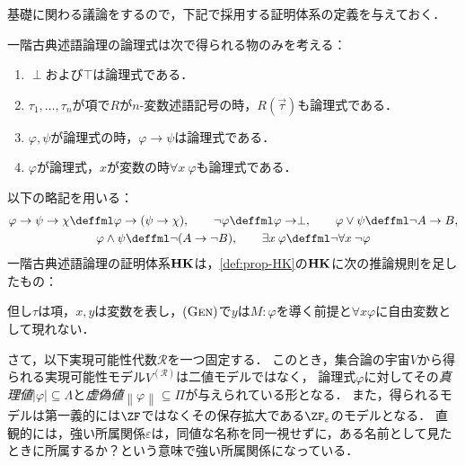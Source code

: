 \documentclass[realisability.tex]{subfiles}
\begin{document}
基礎に関わる議論をするので，下記で採用する証明体系の定義を与えておく．
\begin{definition}
 一階古典述語論理の論理式は次で得られる物のみを考える：
 \begin{enumerate}[series=fml-def]
  \item $\perp$および$\top$は論理式である．
  \item $\tau_1, \dots, \tau_n$が項で$R$が$n$-変数述語記号の時，$R(\vec{\tau})$も論理式である．
  \item $\varphi, \psi$が論理式の時，$\varphi \to \psi$は論理式である．
  \item $\varphi$が論理式，$x$が変数の時$\forall x\: \varphi$も論理式である．
 \end{enumerate}
 以下の略記を用いる：
 \begin{gather*}
  \varphi \to \psi \to \chi \deffml \varphi \to (\psi \to \chi),\qquad
  \neg \varphi \deffml \varphi \to \perp,\qquad
  \varphi \lor \psi \deffml \neg A \to B,\\
  \varphi \land \psi \deffml \neg (A \to \neg B),\qquad
  \exists x \: \varphi \deffml \neg \forall x\: \neg \varphi
 \end{gather*}
 一階古典述語論理の証明体系$\mathord{\mathbf{HK}}$は，\cref{def:prop-HK}の$\mathord{\mathbf{HK}}$に次の推論規則を足したもの：
 \begin{center}
 \end{center} 
 但し$\tau$は項，$x, y$は変数を表し，$(\mathord{\textsc{Gen}})$で$y$は$M: \varphi$を導く前提と$\forall x \varphi$に自由変数として現れない．
\end{definition}
さて，以下実現可能性代数$\mathcal{R}$を一つ固定する．
このとき，集合論の宇宙$V$から得られる実現可能性モデル$V^{(\mathcal{R})}$は二値モデルではなく，
論理式$\varphi$に対してその\emph{真理値}$|\varphi| \subseteq \Lambda$と\emph{虚偽値}$\left\|\varphi\right\| \subseteq \Pi$が与えられている形となる．
また，得られるモデルは第一義的には$\ZF$ではなくその保存拡大である$\ZF_\varepsilon$のモデルとなる．
直観的には，強い所属関係$\varepsilon$は，同値な名称を同一視せずに，ある名前として見たときに所属するか？という意味で強い所属関係になっている．
\end{document}
